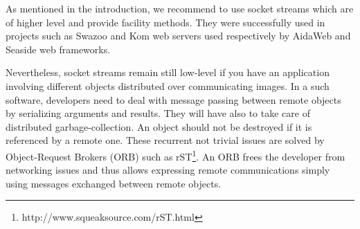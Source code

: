 \documentclass[a4paper,10pt,twoside]{book}
\begin{document}
As mentioned in the introduction, we recommend to use socket streams which are of higher level and provide facility methods.
They were successfully used in projects such as Swazoo and Kom web servers used respectively by AidaWeb and Seaside web frameworks.

Nevertheless, socket streams remain still low-level if you have an application involving different objects distributed over communicating images.
In a such software, developers need to deal with message passing between remote objects by serializing arguments and results.
They will have also to take care of distributed garbage-collection.
An object should not be destroyed if it is referenced by a remote one.
These recurrent not trivial issues are solved by Object-Request Brokers (ORB) such as rST\footnote{http://www.squeaksource.com/rST.html}.
An ORB frees the developer from networking issues and thus allows expressing remote communications simply using messages exchanged between remote objects.


\ifx\wholebook\relax\else
\end{document}
